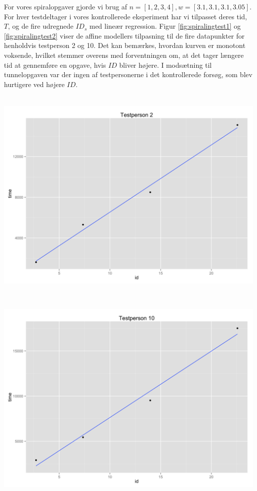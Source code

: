 For vores spiralopgaver gjorde vi brug af $n=[1,2,3,4], w=[3.1,3.1,3.1,3.05]$. For hver testdeltager i vores kontrollerede eksperiment har vi tilpasset deres tid, $T$, og de fire udregnede $ID_s$ med lineær regression. Figur \ref{fig:spiralingtest1} og \ref{fig:spiralingtest2} viser de affine modellers tilpasning til de fire datapunkter for henholdvis testperson 2 og 10. Det kan bemærkes, hvordan kurven er monotont voksende, hvilket stemmer overens med forventningen om, at det tager længere tid at gennemføre en opgave, hvis $ID$ bliver højere. I modsætning til tunnelopgaven var der ingen af testpersonerne i det kontrollerede forsøg, som blev hurtigere ved højere $ID$.\\\\
\begin{minipage}{\linewidth}
	\begin{minipage}[b]{.45\linewidth}
		\includegraphics[width=\textwidth]{images/plots/plot_model_test_spiraling_1}
		\label{fig:spiralingtest1}
	\end{minipage}
	\begin{minipage}[b]{0.1\linewidth}
	~
	\end{minipage}
	\begin{minipage}[b]{0.45\linewidth}
		\includegraphics[width=\textwidth]{images/plots/plot_model_test_spiraling_2}

\end{minipage}
\end{minipage}
